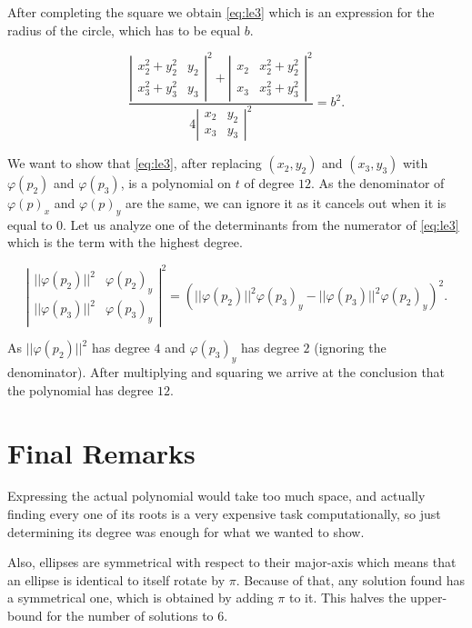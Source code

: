 After completing the square we obtain \autoref{eq:le3} which is an expression for the radius of the circle, which has to be equal $b$.

\begin{equation}\label{eq:le3}
\dfrac{\left|
	\begin{array}{cc}
	x_2^2+y_2^2&y_2\\
	x_3^2+y_3^2&y_3
	\end{array}\right|^2
+\left|
\begin{array}{cc}
x_2&x_2^2+y_2^2\\
x_3&x_3^2+y_3^2
\end{array}\right|^2
}{4\left|
\begin{array}{cc}
x_2&y_2\\
x_3&y_3
\end{array}\right|^2} = b^2.
\end{equation}

We want to show that \autoref{eq:le3}, after replacing $(x_2, y_2)$ and $(x_3, y_3)$ with $\varphi(p_2)$ and $\varphi(p_3)$, is a polynomial on $t$ of degree $12$. As the denominator of $\varphi(p)_x$ and $\varphi(p)_y$ are the same, we can ignore it as it cancels out when it is equal to $0$. Let us analyze one of the determinants from the numerator of \autoref{eq:le3} which is the term with the highest degree.

\begin{equation}\label{eq:num1}
\left|
	\begin{array}{cc}
	||\varphi(p_2)||^2&\varphi(p_2)_y\\
	||\varphi(p_3)||^2&\varphi(p_3)_y
	\end{array}\right|^2=(||\varphi(p_2)||^2\varphi(p_3)_y-||\varphi(p_3)||^2\varphi(p_2)_y)^2.
\end{equation}

As $||\varphi(p_2)||^2$ has degree $4$ and $\varphi(p_3)_y$ has degree $2$ (ignoring the denominator). After multiplying and squaring we arrive at the conclusion that the polynomial has degree $12$.

\section{Final Remarks}

Expressing the actual polynomial would take too much space, and actually finding every one of its roots is a very expensive task computationally, so just determining its degree was enough for what we wanted to show.

Also, ellipses are symmetrical with respect to their major-axis which means that an ellipse is identical to itself rotate by $\pi$. Because of that, any solution found has a symmetrical one, which is obtained by adding $\pi$ to it. This halves the upper-bound for the number of solutions to $6$.